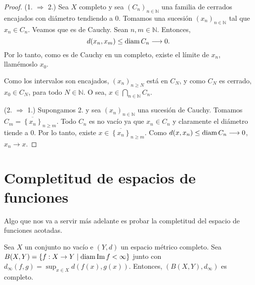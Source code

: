 \begin{proof}
	(1. $\Rightarrow$ 2.) Sea $X$ completo y sea $(C_n)_{n \in \mathbb{N}}$ una familia de cerrados encajados con diámetro tendiendo a $0$. Tomamos una sucesión $(x_n)_{n \in \mathbb{N}}$ tal que $x_n \in C_n$. Veamos que es de Cauchy. Sean $n, m \in \mathbb{N}$. Entonces,
	\begin{equation*}
		d(x_n, x_m) \leq \operatorname{diam} C_n \longrightarrow 0.
	\end{equation*}
	Por lo tanto, como es de Cauchy en un completo, existe el límite de $x_n$, llamémoslo $x_0$.

	Como los intervalos son encajados, $(x_n)_{n \geq N}$ está en $C_N$, y como $C_N$ es cerrado, $x_0 \in C_N$, para todo $N \in \mathbb{N}$. O sea, $x \in \bigcap_{n \in \mathbb{N}} C_n$.

	(2. $\Rightarrow$ 1.) Supongamos 2. y sea $(x_n)_{n \in \mathbb{N}}$ una sucesión de Cauchy. Tomamos $C_m = \overline{\left\{ x_n \right\}}_{n \geq m}$. Todo $C_n$ es no vacío ya que $x_n \in C_n$ y claramente el diámetro tiende a $0$. Por lo tanto, existe $x \in \overline{\left\{ x_n \right\}}_{n \geq m}$. Como $d(x, x_n) \leq \operatorname{diam} C_n \longrightarrow 0$, $x_n \longrightarrow x$.
\end{proof}

\section{Completitud de espacios de funciones}

Algo que nos va a servir más adelante es probar la completitud del espacio de funciones acotadas.

\begin{theorem}
	Sea $X$ un conjunto no vacío e $(Y, d)$ un espacio métrico completo. Sea $B(X, Y) = \left\{ f : X \to Y \mid \operatorname{diam} \operatorname{Im} f < \infty \right\}$ junto con $d_{\infty} (f, g) = \sup_{x \in X} d(f(x), g(x))$. Entonces, $(B(X, Y), d_{\infty})$ es completo.
\end{theorem}

